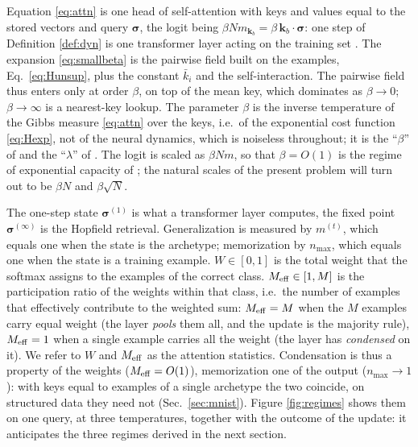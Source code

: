 \documentclass{SciPost}
\theoremstyle{plain}
\theoremstyle{definition}
\newcommand{\s}{\bm{\sigma}}
\newcommand{\Meff}{M_{\rm eff}}
\begin{document}
Equation \eqref{eq:attn} is one head of self-attention with keys and values equal to the stored vectors and query $\s$, the logit being $\beta N m_{\bm k_b}=\beta\,\bm k_b\cdot\s$: one step of Definition \ref{def:dyn} is one transformer layer acting on the training set \cite{Ramsauer2021}. The expansion \eqref{eq:smallbeta} is the pairwise field built on the examples, Eq.\ \eqref{eq:Hunsup}, plus the constant $\bar k_i$ and the self-interaction. The pairwise field thus enters only at order $\beta$, on top of the mean key, which dominates as $\beta\to0$; $\beta\to\infty$ is a nearest-key lookup. The parameter $\beta$ is the inverse temperature of the Gibbs measure \eqref{eq:attn} over the keys, i.e.\ of the exponential cost function \eqref{eq:Hexp}, not of the neural dynamics, which is noiseless throughout; it is the ``$\beta$'' of \cite{Ramsauer2021} and the ``$\lambda$'' of \cite{Lucibello2024}. The logit is scaled as $\beta N m$, so that $\beta=O(1)$ is the regime of exponential capacity of \cite{Lucibello2024,Albanese2025exp}; the natural scales of the present problem will turn out to be $\beta N$ and $\beta\sqrt N$.

The one-step state $\s^{(1)}$ is what a transformer layer computes, the fixed point $\s^{(\infty)}$ is the Hopfield retrieval. Generalization is measured by $m^{(t)}$, which equals one when the state is the archetype; memorization by $n_{\max}$, which equals one when the state is a training example. $W\in[0,1]$ is the total weight that the softmax assigns to the examples of the correct class. $\Meff\in[1,M]$ is the participation ratio of the weights within that class, i.e.\ the number of examples that effectively contribute to the weighted sum: $\Meff=M$ when the $M$ examples carry equal weight (the layer \emph{pools} them all, and the update is the majority rule), $\Meff=1$ when a single example carries all the weight (the layer has \emph{condensed} on it). We refer to $W$ and $\Meff$ as the attention statistics. Condensation is thus a property of the weights ($\Meff=O(1)$), memorization one of the output ($n_{\max}\to1$): with keys equal to examples of a single archetype the two coincide, on structured data they need not (Sec.\ \ref{sec:mnist}). Figure \ref{fig:regimes} shows them on one query, at three temperatures, together with the outcome of the update: it anticipates the three regimes derived in the next section.
\end{document}
